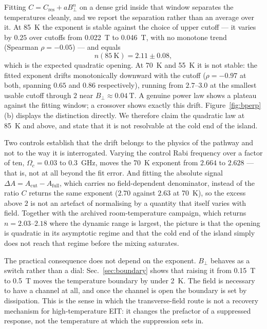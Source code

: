 \documentclass[
  reprint,
  amsmath,amssymb,
  aps,pra,
  superscriptaddress,
  floatfix,
]{revtex4-2}
\newcommand{\Bperp}{B_{\perp}}
\newcommand{\Acut}{A_{\mathrm{cut}}}
\newcommand{\Afull}{A_{\mathrm{full}}}
\begin{document}
Fitting $C=C_{\mathrm{res}}+a\Bperp^{n}$ on a dense grid inside that window
separates the temperatures cleanly, and we report the separation rather than
an average over it. At \SI{85}{\kelvin} the exponent is stable against the
choice of upper cutoff --- it varies by $0.25$ over cutoffs from
\SI{0.022}{\tesla} to \SI{0.046}{\tesla}, with no monotone trend (Spearman
$\rho=-0.05$) --- and equals
%
\begin{equation}
n(\SI{85}{\kelvin}) = 2.11 \pm 0.08 ,
\end{equation}
%
which is the expected quadratic opening. At \SI{70}{\kelvin} and
\SI{55}{\kelvin} it is not stable: the fitted exponent drifts monotonically
downward with the cutoff ($\rho=-0.97$ at both, spanning $0.65$ and $0.86$
respectively), running from $2.7$--$3.0$ at the smallest usable cutoff through
$2$ near $\Bperp\approx\SI{0.04}{\tesla}$. A genuine power law shows a plateau
against the fitting window; a crossover shows exactly this drift.
Figure~\ref{fig:bperp}(b) displays the distinction directly. We therefore
claim the quadratic law at \SI{85}{\kelvin} and above, and state that it is
not resolvable at the cold end of the island.

Two controls establish that the drift belongs to the physics of the pathway
and not to the way it is interrogated. Varying the control Rabi frequency over
a factor of ten, $\Omega_{c}=0.03$ to \SI{0.3}{\giga\hertz}, moves the
\SI{70}{\kelvin} exponent from $2.664$ to $2.628$ --- that is, not at all
beyond the fit error. And fitting the absolute signal
$\Delta A=\Acut-\Afull$, which carries no field-dependent denominator, instead
of the ratio $C$ returns the same exponent ($2.70$ against $2.63$ at
\SI{70}{\kelvin}), so the excess above $2$ is not an artefact of normalising
by a quantity that itself varies with field. Together with the archived
room-temperature campaign, which returns $n=2.03$--$2.18$ where the dynamic
range is largest, the picture is that the opening is quadratic in its
asymptotic regime and that the cold end of the island simply does not reach
that regime before the mixing saturates.

The practical consequence does not depend on the exponent. $\Bperp$ behaves as
a switch rather than a dial: Sec.~\ref{sec:boundary} shows that raising it
from \SI{0.15}{\tesla} to \SI{0.5}{\tesla} moves the temperature boundary by
under \SI{2}{\kelvin}. The field is necessary to have a channel at all, and
once the channel is open the boundary is set by dissipation. This is the sense
in which the transverse-field route is not a recovery mechanism for
high-temperature EIT: it changes the prefactor of a suppressed response, not
the temperature at which the suppression sets in.
\end{document}
